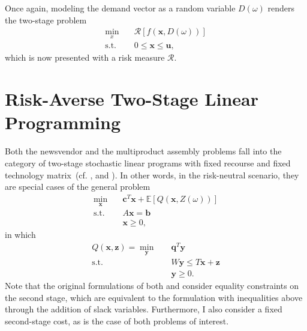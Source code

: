 \documentclass[twoside,11pt]{article}
\begin{document}
Once again, modeling the demand vector as a random variable $D(\omega)$ renders the two-stage problem
\begin{align*}
    \min_{x} \quad & \mathcal{R}\left[ f(\bm{x},D(\omega)) \right]  \\
    \textrm{s.t.} \quad & 0\le \bm{x} \le \bm{u}
,\end{align*}
which is now presented with a risk measure $\mathcal{R}$.


\section*{Risk-Averse Two-Stage Linear Programming}

Both the newsvendor and the multiproduct assembly problems fall into the category of two-stage stochastic linear programs with fixed recourse and fixed technology matrix~(cf. \cite[Sec.~3.1]{birgeIntroductionStochasticProgramming2011}, and \cite[Sec.~2.1]{shapiroLecturesStochasticProgramming2009}).
In other words, in the risk-neutral scenario, they are special cases of the general problem
\begin{align*}
    \min_{\bm{x}} \quad & \bm{c}^{T}\bm{x} + \mathbb{E}\left[ Q(\bm{x},Z(\omega)) \right]  \\
    \textrm{s.t.} \quad & A\bm{x} = \bm{b} \\
      & \bm{x} \ge 0
,\end{align*}
in which 
\begin{align*}
    Q(\bm{x},\bm{z}) = \min_{\bm{y}} \quad & \bm{q}^{T}\bm{y} \\
    \textrm{s.t.} \quad & W\bm{y} \le T\bm{x} + \bm{z} \\
      & \bm{y} \ge 0
.\end{align*}
Note that the original formulations of both \citet{birgeIntroductionStochasticProgramming2011} and \citet{shapiroLecturesStochasticProgramming2009} consider equality constraints on the second stage, which are equivalent to the formulation with inequalities above through the addition of slack variables.
Furthermore, I also consider a fixed second-stage cost, as is the case of both problems of interest.
\end{document}
